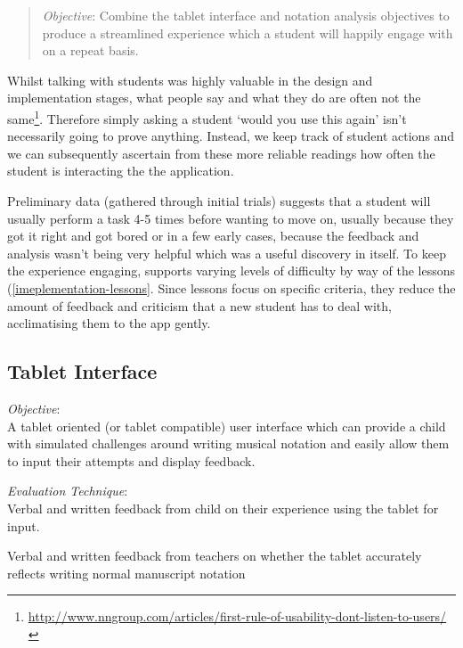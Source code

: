 \begin{quotation}
\emph{Objective}: Combine the tablet interface and notation analysis objectives to produce a streamlined experience which a student will happily engage with on a repeat basis.
\end{quotation}

Whilst talking with students was highly valuable in the design and implementation stages, what people say and what they do are often not the same\footnote{\url{http://www.nngroup.com/articles/first-rule-of-usability-dont-listen-to-users/}}. Therefore simply asking a student `would you use this again' isn't necessarily going to prove anything. Instead, we keep track of student actions and we can subsequently ascertain from these more reliable readings how often the student is interacting the the application.

Preliminary data (gathered through initial trials) suggests that a student will usually perform a task 4-5 times before wanting to move on, usually because they got it right and got bored or in a few early cases, because the feedback and analysis wasn't being very helpful which was a useful discovery in itself. To keep the experience engaging, \noteED supports varying levels of difficulty by way of the lessons (\cref{imeplementation-lessons}. Since lessons focus on specific criteria, they reduce the amount of feedback and criticism that a new student has to deal with, acclimatising them to the app gently.

\subsection{Tablet Interface}

\emph{Objective}: \\
A tablet oriented (or tablet compatible) user interface which can provide a child with simulated challenges around writing musical notation and easily allow them to input their attempts and display feedback.

\emph{Evaluation Technique}: \\
Verbal and written feedback from child on their experience using the tablet for input.

Verbal and written feedback from teachers on whether the tablet accurately reflects writing normal manuscript notation

\clearpage
